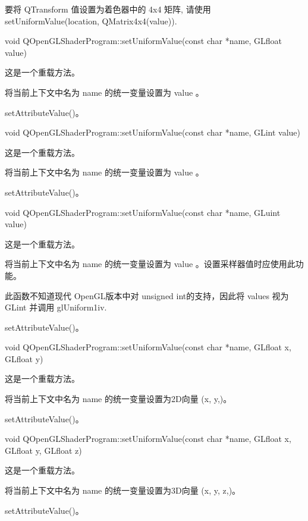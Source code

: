 要将 QTransform 值设置为着色器中的 4x4 矩阵, 请使用 setUniformValue(location, QMatrix4x4(value)).

void QOpenGLShaderProgram::setUniformValue(const char *name, GLfloat value)

这是一个重载方法。

将当前上下文中名为 name 的统一变量设置为 value 。

\begin{seeAlso}
setAttributeValue()。
\end{seeAlso}

void QOpenGLShaderProgram::setUniformValue(const char *name, GLint value)

这是一个重载方法。

将当前上下文中名为 name 的统一变量设置为 value 。

\begin{seeAlso}
setAttributeValue()。
\end{seeAlso}

void QOpenGLShaderProgram::setUniformValue(const char *name, GLuint value)

这是一个重载方法。

将当前上下文中名为 name 的统一变量设置为 value 。设置采样器值时应使用此功能。

\begin{notice}
此函数不知道现代 OpenGL版本中对 unsigned int的支持，因此将 values 视为 GLint 并调用 glUniform1iv.
\end{notice}

\begin{seeAlso}
setAttributeValue()。
\end{seeAlso}

void QOpenGLShaderProgram::setUniformValue(const char *name, GLfloat x, GLfloat y)

这是一个重载方法。

将当前上下文中名为 name 的统一变量设置为2D向量 (x, y,)。

\begin{seeAlso}
setAttributeValue()。
\end{seeAlso}

void QOpenGLShaderProgram::setUniformValue(const char *name, GLfloat x, GLfloat y, GLfloat z)

这是一个重载方法。

将当前上下文中名为 name 的统一变量设置为3D向量 (x, y, z,)。


\begin{seeAlso}
setAttributeValue()。
\end{seeAlso}

